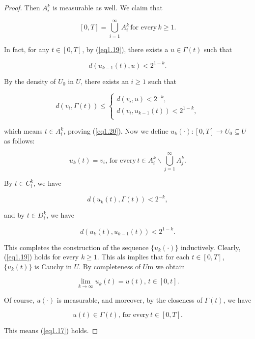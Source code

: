 \begin{proof}
Then $A^k_i$ is measurable as well. We claim that

\begin{equation}\label{eq1.20}
[0,T]=\bigcup^{\infty}_{i=1}A^k_i\,\mbox{for every}\,k\geq 1.
\end{equation}

In fact, for any $t\in[0,T]$, by (\ref{eq1.19}), there exists a $u\in\Gamma(t)$ such that 

$$d(u_{k-1}(t),u)<2^{1-k}.$$

By the density of $U_0$ in $U$, there exists an $i\geq 1$ such that

$$d(v_i,\Gamma(t))\leq\left\{ \begin{array}{l}
	d(v_i,u)< 2^{-k},  \\
	d(v_i,u_{k-1}(t))<2^{1-k},\\
\end{array}
\right.$$

which means $t\in A^k_i$, proving (\ref{eq1.20}). Now we define $u_k(\cdot):[0,T]\rightarrow U_0\subseteq U$ as follows:

$$u_k(t)=v_i,\,\mbox{for every}\, t\in A^k_{i}\backslash \bigcup^{\infty}_{j=1}A^k_j.$$

By $t\in C^k_i$, we have 

$$d(u_k(t),\Gamma(t))<2^{-k},$$

and by $t\in D^k_i$, we have

$$d(u_k(t),u_{k-1}(t))<2^{1-k}.$$

This completes the construction of the sequence $\{u_k(\cdot)\}$ inductively. Clearly, (\ref{eq1.19}) holds for every $k\geq 1$. This als implies that for each $t\in[0,T]$, $\{u_k(t)\}$ is Cauchy in $U$. By completeness of $U$m we obtain 

$$\lim_{k\rightarrow \infty} u_k(t)=u(t),\, t\in [0,t].$$

Of course, $u(\cdot)$ is measurable, and moreover, by the closeness of $\Gamma(t)$, we have

$$u(t)\in \Gamma(t),\,\mbox{for every}\, t\in [0,T].$$

This means (\ref{eq1.17}) holds.
\end{proof}

